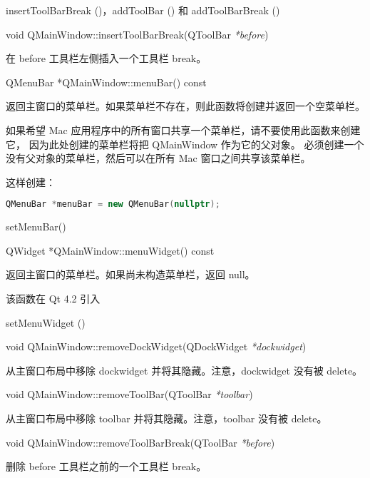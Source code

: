 \begin{seeAlso}
insertToolBarBreak ()，addToolBar () 和 addToolBarBreak ()
\end{seeAlso}

\splitLine

void QMainWindow::insertToolBarBreak(QToolBar \emph{*before})

在 before 工具栏左侧插入一个工具栏 break。

\splitLine

QMenuBar *QMainWindow::menuBar() const

返回主窗口的菜单栏。如果菜单栏不存在，则此函数将创建并返回一个空菜单栏。

如果希望 Mac 应用程序中的所有窗口共享一个菜单栏，请不要使用此函数来创建它，
因为此处创建的菜单栏将把 QMainWindow 作为它的父对象。
必须创建一个没有父对象的菜单栏，然后可以在所有 Mac 窗口之间共享该菜单栏。

这样创建：

\begin{lstlisting}[language=C++]
QMenuBar *menuBar = new QMenuBar(nullptr);
\end{lstlisting}

\begin{seeAlso}
setMenuBar()
\end{seeAlso}

\splitLine

QWidget *QMainWindow::menuWidget() const

返回主窗口的菜单栏。如果尚未构造菜单栏，返回 null。

该函数在 Qt 4.2 引入

\begin{seeAlso}
setMenuWidget ()
\end{seeAlso}

\splitLine

void QMainWindow::removeDockWidget(QDockWidget \emph{*dockwidget})

从主窗口布局中移除 dockwidget 并将其隐藏。注意，dockwidget 没有被 delete。

\splitLine

void QMainWindow::removeToolBar(QToolBar \emph{*toolbar})

从主窗口布局中移除 toolbar 并将其隐藏。注意，toolbar 没有被 delete。

\splitLine

void QMainWindow::removeToolBarBreak(QToolBar \emph{*before})

删除 before 工具栏之前的一个工具栏 break。

